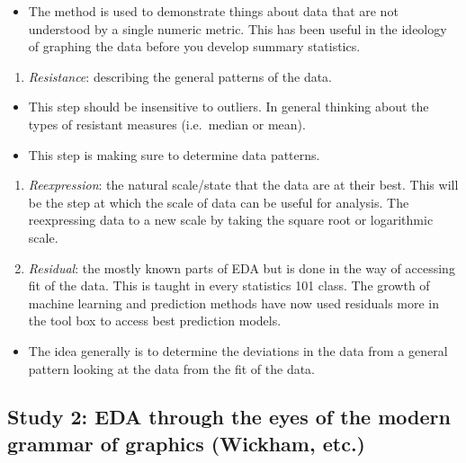 \documentclass[print]{nuthesis}
\providecommand{\tightlist}{%
  \setlength{\itemsep}{0pt}\setlength{\parskip}{0pt}}
\begin{document}
\begin{itemize}
\tightlist
\item
  The method is used to demonstrate things about data that are not understood by a single numeric metric. This has been useful in the ideology of graphing the data before you develop summary statistics.
\end{itemize}

\begin{enumerate}
\def\labelenumi{\arabic{enumi}.}
\setcounter{enumi}{1}
\tightlist
\item
  \emph{Resistance}: describing the general patterns of the data.
\end{enumerate}

\begin{itemize}
\tightlist
\item
  This step should be insensitive to outliers. In general thinking about the types of resistant measures (i.e.~median or mean).
\item
  This step is making sure to determine data patterns.
\end{itemize}

\begin{enumerate}
\def\labelenumi{\arabic{enumi}.}
\setcounter{enumi}{2}
\item
  \emph{Reexpression}: the natural scale/state that the data are at their best. This will be the step at which the scale of data can be useful for analysis. The reexpressing data to a new scale by taking the square root or logarithmic scale.
\item
  \emph{Residual}: the mostly known parts of EDA but is done in the way of accessing fit of the data. This is taught in every statistics 101 class. The growth of machine learning and prediction methods have now used residuals more in the tool box to access best prediction models.
\end{enumerate}

\begin{itemize}
\tightlist
\item
  The idea generally is to determine the deviations in the data from a general pattern looking at the data from the fit of the data.
\end{itemize}

\hypertarget{study-2-eda-through-the-eyes-of-the-modern-grammar-of-graphics-wickham-etc.}{%
\subsection{Study 2: EDA through the eyes of the modern grammar of graphics (Wickham, etc.)}\label{study-2-eda-through-the-eyes-of-the-modern-grammar-of-graphics-wickham-etc.}}
\end{document}
